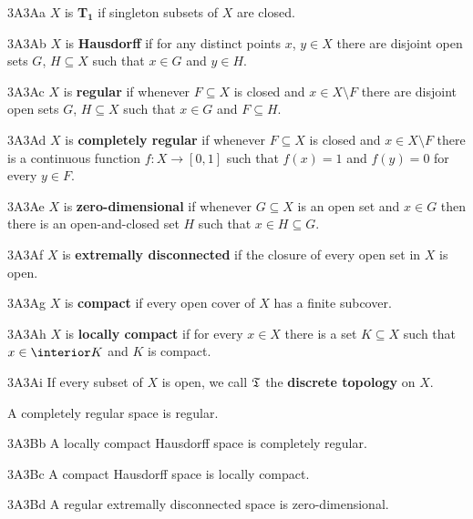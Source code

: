 \spheader 3A3Aa $X$ is {\bf T$_{\pmb{1}}$} if singleton subsets of $X$ are
closed.

\spheader 3A3Ab $X$ is {\bf Hausdorff} if for any
distinct points $x$,
$y\in X$ there are disjoint open sets $G$, $H\subseteq X$ such that
$x\in G$ and $y\in H$.

\spheader 3A3Ac $X$ is {\bf regular} if whenever $F\subseteq X$ is
closed and $x\in X\setminus F$ there are disjoint open sets $G$,
$H\subseteq X$ such that $x\in G$ and $F\subseteq H$.   

\spheader 3A3Ad $X$ is {\bf completely regular} if whenever
$F\subseteq X$ is closed and $x\in X\setminus F$ there is a
continuous function
$f:X\to[0,1]$ such that $f(x)=1$ and $f(y)=0$ for every $y\in F$.

\spheader 3A3Ae $X$ is {\bf zero-dimensional} if whenever $G\subseteq X$
is an open set and $x\in G$ then there is an open-and-closed set $H$
such that $x\in H\subseteq G$.

\spheader 3A3Af $X$ is {\bf extremally disconnected} if the closure of
every open set in $X$ is open.

\spheader 3A3Ag $X$ is {\bf compact} if every open cover of $X$
has a finite subcover.

\spheader 3A3Ah $X$ is {\bf locally compact} if for every $x\in X$ there
is a set $K\subseteq X$ such that $x\in\interior K$ and $K$ is
compact.

\spheader 3A3Ai If every subset of $X$ is open, we call $\frak T$ the
{\bf discrete topology} on $X$.

 A completely regular space
is regular.  

\spheader 3A3Bb A locally compact Hausdorff space is completely
regular.   \cmmnt{$*$}

\spheader 3A3Bc A compact Hausdorff space is locally compact.

\spheader 3A3Bd A regular extremally disconnected space is
zero-dimensional.  

